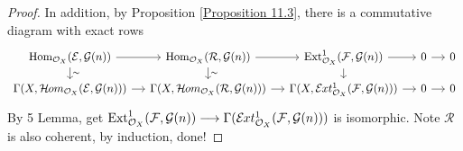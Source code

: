 \documentclass{ctexart}
\renewcommand{\hom}{\operatorname{Hom}}
\newcommand{\ext}{\operatorname{Ext}}
\newcommand{\sheafhom}{\mathcal{H}\kern -.5pt om}
\newcommand{\sheafext}{\mathcal{E}\kern -.5pt xt}
\begin{document}
\begin{proof}
    In addition, by Proposition \ref{Proposition 11.3}, there is a commutative diagram with exact rows 
    \begin{equation*}
        \begin{tikzcd}[sep = small]
            \hom_{\mathcal{O}_{X}}(\mathcal{E}, \mathcal{G}(n)) \arrow[r] \arrow[d, "\sim"] &
            \hom_{\mathcal{O}_{X}}(\mathcal{R}, \mathcal{G}(n)) \arrow[r] \arrow[d, "\sim"] &
            \ext_{\mathcal{O}_{X}}^{1}(\mathcal{F}, \mathcal{G}(n)) \arrow[r] \arrow[d] &
            0 \arrow[r] &
            0 \\
            \Gamma(X, \sheafhom_{\mathcal{O}_{X}}(\mathcal{E}, \mathcal{G}(n))) \arrow[r] &
            \Gamma(X, \sheafhom_{\mathcal{O}_{X}}(\mathcal{R}, \mathcal{G}(n))) \arrow[r] &
            \Gamma(X, \sheafext_{\mathcal{O}_{X}}^{1}(\mathcal{F}, \mathcal{G}(n))) \arrow[r] &
            0 \arrow[r] &
            0
        \end{tikzcd}
    \end{equation*}
    By 5 Lemma, get $\ext_{\mathcal{O}_{X}}^{1}(\mathcal{F}, \mathcal{G}(n)) \longrightarrow \Gamma(\sheafext_{\mathcal{O}_{X}}^{1}(\mathcal{F}, \mathcal{G}(n)))$ is isomorphic.
    Note $\mathcal{R}$ is also coherent, by induction, done!
\end{proof}
\end{document}
